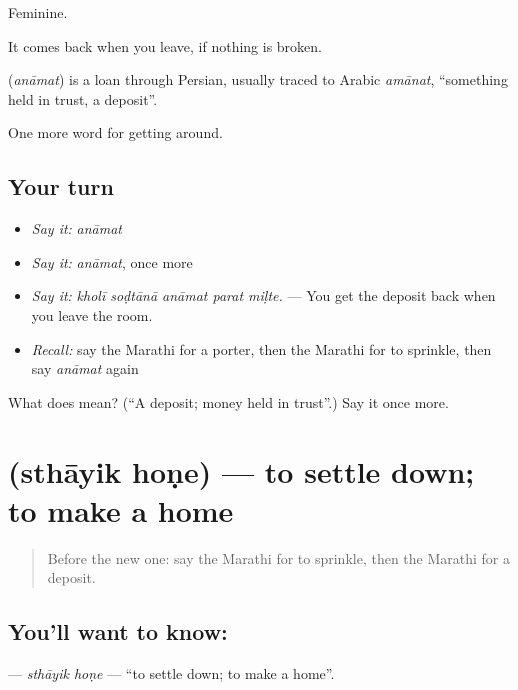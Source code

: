 Feminine.

It comes back when you leave, if nothing is broken.

\begin{cousinweb}
\textbf{} (\emph{anāmat}) is a loan through Persian, usually traced to Arabic \emph{amānat}, \textquotedblleft{}something held in trust, a deposit\textquotedblright{}.
\end{cousinweb}

\begin{grammarlens}[title={What you've built}]
One more word for getting around.
\end{grammarlens}

\subsection*{Your turn}
\begin{itemize}
\raggedright
  \item \emph{Say it:} \emph{anāmat}
  \item \emph{Say it:} \emph{anāmat}, once more
  \item \emph{Say it:} \emph{kholī soḍtānā anāmat parat miḷte.} — You get the deposit back when you leave the room.
  \item \emph{Recall:} say the Marathi for a porter, then the Marathi for to sprinkle, then say \emph{anāmat} again
\end{itemize}

\begin{tcolorbox}[breakable,colback=teal!4,colframe=teal!35!black,title={Before you move on}]
What does  mean? (\textquotedblleft{}A deposit; money held in trust\textquotedblright{}.) Say it once more.
\end{tcolorbox}
\section[\texorpdfstring{\mr{स्थायिक} \mr{होणे} (sthāyik hoṇe)}{स्थायिक होणे (sthāyik hoṇe)}]{  (sthāyik hoṇe) — to settle down; to make a home}

\label{lesson:MR-C417-sthayik-hone}



\begin{quote}
Before the new one: say the Marathi for to sprinkle, then the Marathi for a deposit.
\end{quote}

\subsection*{You'll want to know:  }
\textbf{ } — \emph{sthāyik hoṇe} — \textquotedblleft{}to settle down; to make a home\textquotedblright{}.


